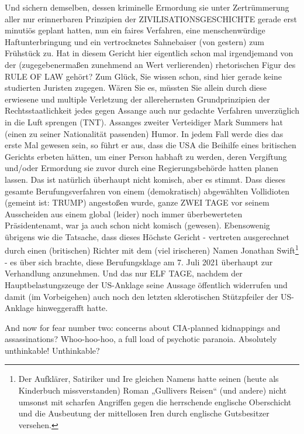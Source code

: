 \begin{multicols}{2}
{Und sichern demselben, dessen kriminelle Ermordung
sie unter Zertrümmerung aller nur erinnerbaren Prinzipien der ZIVILISATIONSGESCHICHTE gerade erst
minutiös geplant hatten, nun ein faires Verfahren, eine
menschenwürdige Haftunterbringung und ein vertrocknetes Sahnebaiser (von gestern) zum Frühstück zu.\textCR
Hat in diesem Gericht hier eigentlich schon mal irgendjemand von der (zugegebenermaßen zunehmend an
Wert verlierenden) rhetorischen Figur des RULE OF LAW
gehört? Zum Glück, Sie wissen schon, sind hier gerade
keine studierten Juristen zugegen. Wären Sie es, müssten
Sie allein durch diese erwiesene und multiple Verletzung
der allerehernsten Grundprinzipien der Rechtsstaatlichkeit jedes gegen Assange auch nur gedachte Verfahren
unverzüglich in die Luft sprengen (TNT).\textCR
Assanges zweiter Verteidiger Mark Summers hat (einen
zu seiner Nationalität passenden) Humor. In jedem Fall
werde dies das erste Mal gewesen sein, so führt er aus,
dass die USA die Beihilfe eines britischen Gerichts erbeten hätten, um einer Person habhaft zu werden, deren
Vergiftung und/oder Ermordung sie zuvor durch eine
Regierungsbehörde hatten planen lassen.\textCR
Das ist natürlich überhaupt nicht komisch, aber es
stimmt.\textCR
Dass dieses gesamte Berufungsverfahren von einem
(demokratisch) abgewählten Vollidioten (gemeint ist:
TRUMP) angestoßen wurde, ganze ZWEI TAGE vor seinem Ausscheiden aus einem global (leider) noch immer
überbewerteten Präsidentenamt, war ja auch schon
nicht komisch (gewesen). Ebensowenig übrigens wie
die Tatsache, dass dieses Höchste Gericht - vertreten
ausgerechnet durch einen (britischen) Richter mit dem
(viel irischeren) Namen Jonathan Swift\footnote[19]{Der Aufklärer, Satiriker und Ire gleichen Namens hatte seinen (heute als Kinderbuch missverstanden) Roman
„Gullivers Reisen“ (und andere) nicht umsonst mit scharfen Angriffen gegen die herrschende englische Oberschicht und die Ausbeutung der mittellosen Iren durch englische Gutsbesitzer versehen.} - es über sich
brachte, diese Berufungsklage am 7. Juli 2021 überhaupt
zur Verhandlung anzunehmen. Und das nur ELF TAGE,
nachdem der Hauptbelastungszeuge der US-Anklage
seine Aussage öffentlich widerrufen und damit (im Vorbeigehen) auch noch den letzten sklerotischen Stützpfeiler der US-Anklage hinweggerafft hatte.}


And now for fear number two: concerns about CIA-planned kidnappings and assassinations? Whoo-hoo-hoo, a full load of psychotic paranoia. Absolutely unthinkable! Unthinkable?


\end{multicols}
